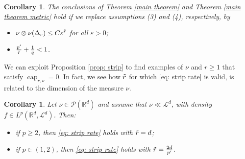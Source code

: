 \documentclass[10pt,leqno]{amsart}
\numberwithin{equation}{section}
\newtheorem{co}[teorema]{Corollary}
\newcommand{\R}{\mathbb{R}}
\newcommand{\PP}{\mathcal{P}}
\begin{document}
\begin{co}
    The conclusions of Theorem \ref{main theorem} and Theorem \ref{main theorem metric} hold if we replace assumptions (3) and (4), respectively, by 
    \begin{itemize}
        \item[(3')] $\nu\otimes \nu(\Delta_\varepsilon)\leq C\varepsilon^{\Tilde{r}}$ for all $\varepsilon>0$;
        \item[(4')] $\frac{p'}{\Tilde{r}} + \frac{1}{q} <1$.
    \end{itemize}
\end{co}

We can exploit Proposition \ref{prop: strip} to find examples of $\nu$ and $r\geq 1$ that satisfy $\operatorname{cap}_{r,\nu} = 0$. In fact, we see how $\Tilde{r}$ for which \eqref{eq: strip rate} is valid, is related to the dimension of the measure $\nu$.

\begin{co}
    Let $\nu\in \PP(\R^d)$ and assume that $\nu\ll\mathcal{L}^d$, with density $f \in L^p(\R^d,\mathcal{L}^d)$. Then:
    \begin{itemize}
        \item[(i)] if $p\geq 2$, then \eqref{eq: strip rate} holds with $\Tilde{r} = d$;
        \item[(ii)] if $p\in (1,2)$, then \eqref{eq: strip rate} holds with $\Tilde{r} = \frac{2d}{p'}$.
    \end{itemize}
\end{co}
\end{document}
